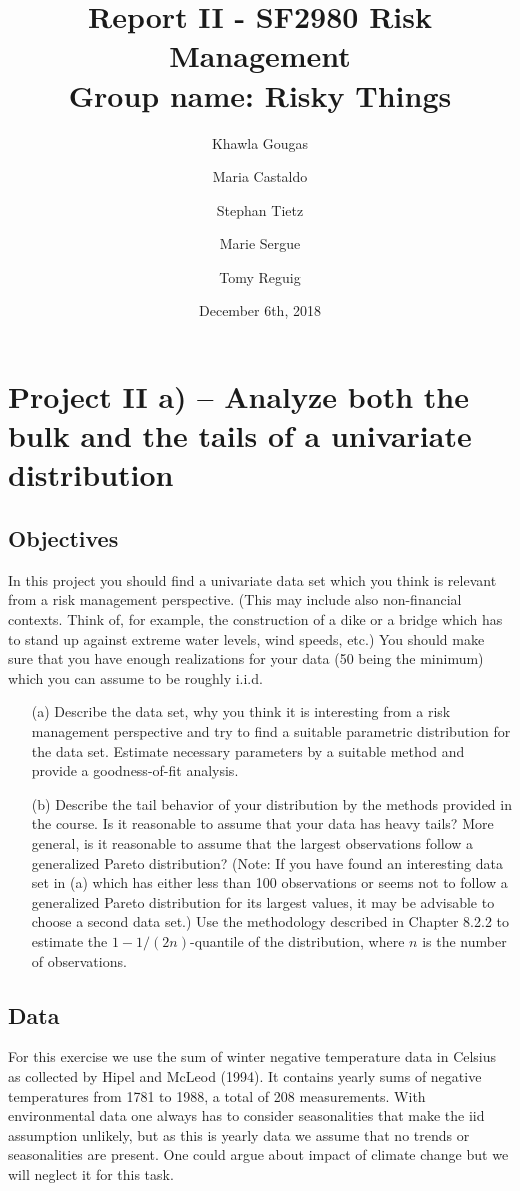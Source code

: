 \documentclass[11pt]{article}
\title{Report II - SF2980 Risk Management \\
Group name: Risky Things}
\author{Khawla Gougas \and Maria Castaldo \and Stephan Tietz \and Marie Sergue \and Tomy Reguig}
\date{December 6th, 2018}                                           %
\begin{document}
\maketitle


\section*{Project II a) -- Analyze both the bulk and the tails of a univariate distribution}
\subsection*{Objectives}

In this project you should find a univariate data set which you think is relevant from a risk management perspective. (This may include also non-financial contexts. Think of, for example, the construction of a dike or a bridge which has to stand up against extreme water levels, wind speeds, etc.) You should make sure that you have enough realizations for your data (50 being the minimum) which you can assume to be roughly i.i.d.\ 
\begin{itemize}
\item[(a)] Describe the data set, why you think it is interesting from a risk management perspective and try to find a suitable parametric distribution for the data set. Estimate necessary parameters by a suitable method and provide a goodness-of-fit analysis. 
\item[(b)] Describe the tail behavior of your distribution by the methods provided in the course. Is it reasonable to assume that your data has heavy tails? More general, is it reasonable to assume that the largest observations follow a generalized Pareto distribution? (Note: If you have found an interesting data set in (a) which has either less than 100 observations or seems not to follow a generalized Pareto distribution for its largest values, it may be advisable to choose a second data set.) Use the methodology described in Chapter 8.2.2 to estimate the $1-1/(2n)$-quantile of the distribution, where $n$ is the number of observations. 
\end{itemize}

\subsection*{Data}


For this exercise we use the sum of winter negative temperature data in Celsius as collected by Hipel and McLeod (1994). It contains yearly sums of negative temperatures from 1781 to 1988, a total of 208 measurements.
With environmental data one always has to consider seasonalities that make the iid assumption unlikely, but as this is yearly data we assume that no trends or seasonalities are present. One could argue about impact of climate change but we will neglect it for this task.
\end{document}
